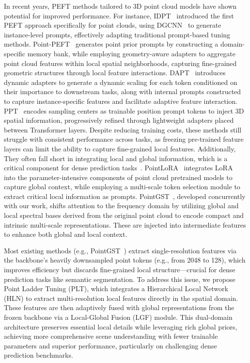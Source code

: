 In recent years, PEFT methods tailored to 3D point cloud models have shown potential for improved performance. 
For instance, IDPT~\cite{zha2023instance} introduced the first PEFT approach specifically for point clouds, using DGCNN~\cite{wang2019dynamic} to generate instance-level prompts, effectively adapting traditional prompt-based tuning methods.
Point-PEFT~\cite{tang2024point} generates point prior prompts by constructing a domain-specific memory bank, while employing geometry-aware adapters to aggregate point cloud features within local spatial neighborhoods, capturing fine-grained geometric structures through local feature interactions. DAPT~\cite{zhou2024dynamic} introduces dynamic adapters to generate a dynamic scaling for each token conditioned on their importance to downstream tasks, along with internal prompts constructed to capture instance-specific features and facilitate adaptive feature interaction. PPT~\cite{zhang2024positional} encodes sampling centers as trainable position prompt tokens to inject 3D spatial information, progressively refined through lightweight adapters placed between Transformer layers. Despite reducing training costs, these methods still struggle with consistent performance across tasks, as freezing pre-trained feature layers can limit the ability to capture fine-grained local features. Additionally, They often fall short in integrating local and global information, which is a critical component for dense prediction tasks~\cite{armeni20163d}. PointLoRA~\cite{wang2025pointlora} integrates LoRA~\cite{hu2021lora} into the parameter-intensive components of point cloud pretrained models to capture global context, while employing a multi-scale token selection module to extract critical local information as prompts. PointGST~\cite{liang2024parameter}, developed concurrently with our work, shifts attention to the frequency domain by utilizing global and local spectral bases derived from the original point cloud to encode compact and intrinsic multi-scale representations. These are injected into intermediate features to enhance both global and local context. 

Most existing methods (e.g., PointGST~\cite{liang2024parameter}) extract single-resolution features via the backbone's heavily downsampled point tokens (e.g., from 2048 to 128), which improves efficiency but discards fine-grained local structure—crucial for dense prediction tasks like semantic segmentation. To address this issue, we propose Point Ladder Tuning (PLT), which integrates a Hierarchical Local Network (HLN) to extract multi-resolution local features directly in the spatial domain. These features are then adaptively fused with global representations from the frozen backbone via a Local-Global Fusion (LGF) module. This dual-domain architecture preserves essential local details while leveraging rich global priors, achieving more comprehensive scene understanding with fewer trainable parameters and superior performance, particularly on challenging dense prediction benchmarks.
